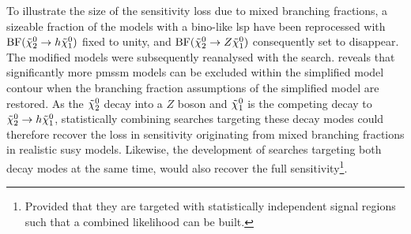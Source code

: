 To illustrate the size of the sensitivity loss due to mixed branching fractions, a sizeable fraction of the models with a bino-like \gls{lsp} have been reprocessed with $\mathrm{BF}(\tilde{\chi}_2^0 \rightarrow h \tilde{\chi}_1^0)$ fixed to unity, and $\mathrm{BF}(\tilde{\chi}_2^0 \rightarrow Z \tilde{\chi}_1^0)$ consequently set to disappear. The modified models were subsequently reanalysed with the \onelepton search.
 reveals that significantly more \gls{pmssm} models can be excluded within the simplified model contour when the branching fraction assumptions of the simplified model are restored. As the $\tilde{\chi}_2^0$ decay into a $Z$ boson and $\tilde{\chi}_1^0$ is the competing decay to $\tilde{\chi}_2^0 \rightarrow h \tilde{\chi}_1^0$, statistically combining searches targeting these decay modes could therefore recover the loss in sensitivity originating from mixed branching fractions in realistic \gls{susy} models. Likewise, the development of searches targeting both decay modes at the same time, would also recover the full sensitivity\footnote{Provided that they are targeted with statistically independent signal regions such that a combined likelihood can be built.}.  

